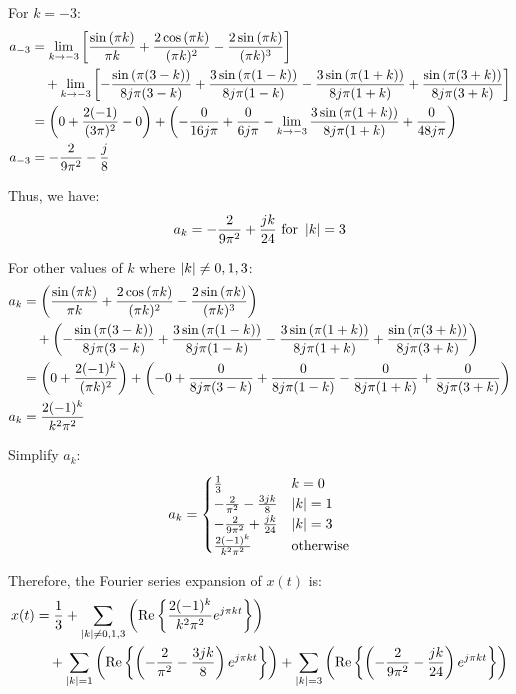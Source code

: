 \documentclass[a4paper, 10pt]{article}
\begin{document}
\begin{tosubmit}
For \( k = -3 \):
\begin{align*}
    a_{-3} &= \lim_{k \to -3} \left[ \frac{\sin{(\pi k)}}{\pi k} + \frac{2 \cos{(\pi k)}}{(\pi k)^2} - \frac {2 \sin{(\pi k)}}{(\pi k)^3} \right] \\
    &\quad + \lim_{k \to -3} \left[ -\frac{\sin{(\pi (3 - k))}}{8j\pi (3 - k)} + \frac{3 \sin{(\pi (1 - k))}}{8j\pi (1 - k)} - \frac{3 \sin{(\pi (1 + k))}}{8j\pi (1 + k)} + \frac{\sin{(\pi (3 + k))}}{8j\pi (3 + k)} \right] \\
    &= \left( 0 + \frac{2(-1)}{(3\pi)^2} - 0 \right) + \left( -\frac{0}{16j\pi} + \frac{0}{6j\pi} - \lim_{k \to -3} \frac{3 \sin{(\pi (1 + k))}}{8j\pi (1 + k)} + \frac{0}{48j\pi} \right) \\
    a_{-3} &= -\frac{2}{9\pi^2} - \frac{j}{8}
\end{align*}

Thus, we have:
\[ a_k = -\frac{2}{9\pi^2} + \frac{jk}{24} \text{ for } \left| k \right| = 3 \]

\vspace{5mm}

For other values of \( k \) where \( \left| k \right| \neq 0, 1, 3 \):
\begin{align*}
    a_k &= \left( \frac{\sin{(\pi k)}}{\pi k} + \frac{2 \cos{(\pi k)}}{(\pi k)^2} - \frac {2 \sin{(\pi k)}}{(\pi k)^3} \right) \\
    &\quad + \left( - \frac{\sin{(\pi (3 - k))}}{8j\pi (3 - k)} + \frac{3 \sin{(\pi (1 - k))}}{8j\pi (1 - k)} - \frac{3 \sin{(\pi (1 + k))}}{8j\pi (1 + k)} + \frac{\sin{(\pi (3 + k))}}{8j\pi (3 + k)} \right) \\
    &= \left( 0 + \frac{2 (-1)^k}{(\pi k)^2} \right) + \left( - 0 + \frac{0}{8j\pi (3 - k)} + \frac{0}{8j\pi (1 - k)} - \frac{0}{8j\pi (1 + k)} + \frac{0}{8j\pi (3 + k)} \right) \\
    a_k &= \frac{2 (-1)^k}{k^2 \pi^2}
\end{align*}

Simplify \( a_k \):
\[
a_k = \begin{cases}
    \frac{1}{3} & k = 0 \\
    -\frac{2}{\pi^2} - \frac{3jk}{8} & \left| k \right| = 1 \\
    -\frac{2}{9\pi^2} + \frac{jk}{24} & \left| k \right| = 3 \\
    \frac{2 (-1)^k}{k^2 \pi^2} & \text{otherwise}
\end{cases}
\]

Therefore, the Fourier series expansion of \( x(t) \) is:
\begin{align*}
    x(t) &= \frac{1}{3} + \sum_{\left| k \right| \neq 0, 1, 3} \left( \text{Re} \left\{ \frac{2 (-1)^k}{k^2 \pi^2} e^{ j \pi k t} \right\} \right) \\
    &\quad + \sum_{\left| k \right| = 1} \left( \text{Re} \left\{ \left( -\frac{2}{\pi^2} - \frac{3jk}{8} \right) e^{ j \pi k t}\right\} \right) + \sum_{\left| k \right| = 3} \left( \text{Re} \left\{ \left( -\frac{2}{9\pi^2} - \frac{jk}{24} \right) e^{ j \pi k t}\right\} \right)
\end{align*}


\end{tosubmit}
\end{document}

